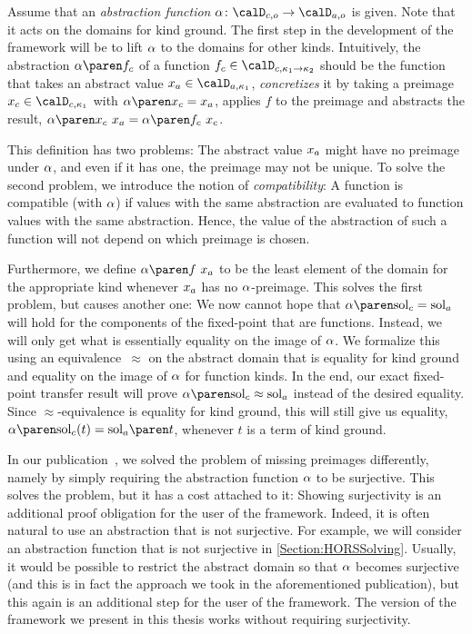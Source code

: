 \documentclass[../../diss.tex]{subfiles}
\begin{document}
Assume that an \emph{abstraction function} $\abs \colon \domainc{\ground} \to \domaina{\ground}$ is given.
Note that it acts on the domains for kind ground.
The first step in the development of the framework will be to lift $\abs$ to the domains for other kinds.
Intuitively, the abstraction $\abs{\fc}$ of a function $\fc \in \domainc{\kappa_1 \to \kappa_2}$ should be the function that takes an abstract value $\xa \in \domaina{\kappa_1}$, \emph{concretizes} it by taking a preimage $\xc \in \domainc{\kappa_1}$ with $\abs{\xc} = \xa$, applies $f$ to the preimage and abstracts the result, $\abs{\xc} \appl \xa = \abs{\fc \appl \xc}$.

This definition has two problems:
The abstract value $x_a$ might have no preimage under $\abs$, and even if it has one, the preimage may not be unique.
To solve the second problem, we introduce the notion of \emph{compatibility}:
A function is compatible (with $\abs$) if values with the same abstraction are evaluated to function values with the same abstraction.
Hence, the value of the abstraction of such a function will not depend on which preimage is chosen.

Furthermore, we define $\abs{f} \appl \xa$ to be the least element of the domain for the appropriate kind whenever $x_a$ has no $\abs$-preimage.
This solves the first problem, but causes another one:
We now cannot hope that $\abs{\solc} = \sola$ will hold for the components of the fixed-point that are functions.
Instead, we will only get what is essentially equality on the image of $\abs$.
We formalize this using an equivalence~$\approx$ on the abstract domain that is equality for kind ground and equality on the image of $\abs$ for function kinds.
In the end, our exact fixed-point transfer result will prove $\abs{\solc} \approx \sola$ instead of the desired equality.
Since $\approx$-equivalence is equality for kind ground, this will still give us equality, $\abs{\solc}(t) = \sola{t}$, whenever $t$ is a term of kind ground.

\begin{remark*}
    In our publication~\cite{HagueMM17}, we solved the problem of missing preimages differently, namely by simply requiring the abstraction function $\abs$ to be surjective.
    This solves the problem, but it has a cost attached to it:
    Showing surjectivity is an additional proof obligation for the user of the framework.
    Indeed, it is often natural to use an abstraction that is not surjective.
    For example, we will consider an abstraction function that is not surjective in \cref{Section:HORSSolving}.
    Usually, it would be possible to restrict the abstract domain so that $\abs$ becomes surjective (and this is in fact the approach we took in the aforementioned publication), but this again is an additional step for the user of the framework.
    The version of the framework we present in this thesis works without requiring surjectivity.
\end{remark*}
\end{document}
